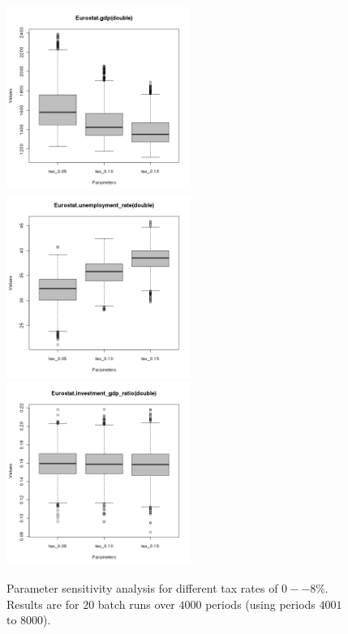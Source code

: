 \begin{figure}[ht!]
\centering\leavevmode
\begin{minipage}{7.5cm}
\centering\leavevmode
\includegraphics[width=6cm]{./batch/Eurostat-gdp-scenarios.png}\\
\includegraphics[width=6cm]{./batch/Eurostat-unemployment_rate-scenarios.png}\\
\includegraphics[width=6cm]{./batch/Eurostat-investment_gdp_ratio-scenarios.png}
\end{minipage}
\caption{Parameter sensitivity analysis for different tax rates of $0 -- 8\%$. Results are for $20$ batch runs over $4000$ periods (using periods $4001$ to $8000$).}
\label{Figure: scenarios}
\end{figure}
